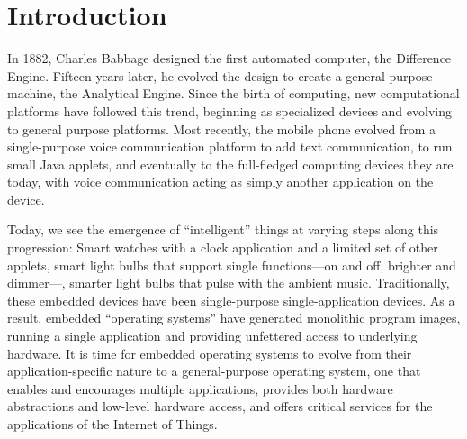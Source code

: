 \section{Introduction}

In 1882, Charles Babbage designed the first automated computer, the Difference
Engine. Fifteen years later, he evolved the design to create a general-purpose
machine, the Analytical Engine. Since the birth of computing, new
computational platforms have followed this trend, beginning as specialized
devices and evolving to general purpose platforms.
Most recently, the mobile phone evolved from a single-purpose voice
communication platform to add text communication, to run small Java applets,
and eventually to the full-fledged computing devices they are today, with
voice communication acting as simply another application on the device.

Today, we see the emergence of ``intelligent'' things at varying steps along
this progression: Smart watches with a clock application and a limited set of
other applets, smart light bulbs that support single functions---on and off,
brighter and dimmer---, smarter light bulbs that pulse with the ambient music.
%
Traditionally, these embedded devices have been single-purpose
single-application devices. As a result, embedded ``operating systems'' have
generated monolithic program images, running a single application and
providing unfettered access to underlying hardware.
%
It is time for embedded operating systems to evolve from their
application-specific nature to a general-purpose operating system,
one that enables and encourages multiple applications, provides both hardware
abstractions and low-level hardware access, and offers critical services for
the applications of the Internet of Things.


%

